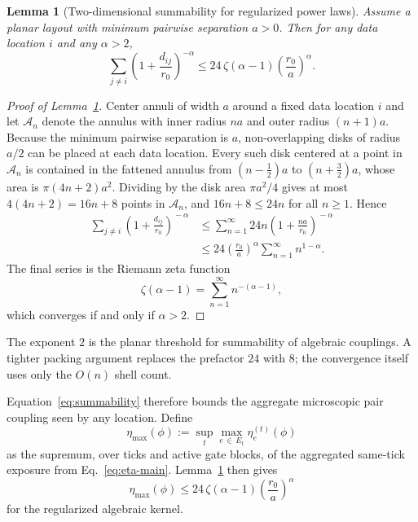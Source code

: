 \documentclass[
aps,
prx,
10pt,
twocolumn,
groupedaddress,
longbibliography,
nofootinbib,
floatfix
]{revtex4-2}
\newtheorem{lemma}{Lemma}
\theoremstyle{definition}
\begin{document}
\begin{lemma}[Two-dimensional summability for regularized power laws]
\label{lem:summability}
Assume a planar layout with minimum pairwise separation $a>0$. Then for any data location $i$ and any $\alpha>2$,
\begin{equation}
\sum_{j\neq i}\left(1+\frac{d_{ij}}{r_0}\right)^{-\alpha}
\le 24\,\zeta\left(\alpha-1\right)\left(\frac{r_0}{a}\right)^{\alpha}.
\label{eq:summability}
\end{equation}
\end{lemma}

\begin{proof}[Proof of Lemma~\ref{lem:summability}]
Center annuli of width $a$ around a fixed data location $i$ and let $\mathcal{A}_n$ denote the annulus with inner radius $na$ and outer radius $(n+1)a$. Because the minimum pairwise separation is $a$, non-overlapping disks of radius $a/2$ can be placed at each data location. Every such disk centered at a point in $\mathcal{A}_n$ is contained in the fattened annulus from $(n-\tfrac{1}{2})a$ to $(n+\tfrac{3}{2})a$, whose area is $\pi(4n+2)a^2$. Dividing by the disk area $\pi a^2/4$ gives at most $4(4n+2)=16n+8$ points in $\mathcal{A}_n$, and $16n+8\le 24n$ for all $n\ge 1$. Hence
\begin{align}
\sum_{j\neq i}\!\left(1+\frac{d_{ij}}{r_0}\right)^{\!-\alpha}
&\le \sum_{n=1}^{\infty}24n\!\left(1+\frac{na}{r_0}\right)^{\!-\alpha}\nonumber\\
&\le 24\!\left(\frac{r_0}{a}\right)^{\!\alpha}
\sum_{n=1}^{\infty} n^{1-\alpha}.
\end{align}
The final series is the Riemann zeta function
\begin{equation}
\zeta\left(\alpha-1\right)=\sum_{n=1}^{\infty}n^{-(\alpha-1)},
\end{equation}
which converges if and only if $\alpha>2$.
\end{proof}

The exponent $2$ is the planar threshold for summability of algebraic couplings. A tighter packing argument replaces the prefactor $24$ with $8$; the convergence itself uses only the $O(n)$ shell count.

Equation~\eqref{eq:summability} therefore bounds the aggregate microscopic pair coupling seen by any location. Define
\begin{equation}
\eta_{\max}(\phi):=\sup_t\max_{e\,\in\, E_t}\eta_e^{(t)}(\phi)
\end{equation}
as the supremum, over ticks and active gate blocks, of the aggregated same-tick exposure from Eq.~\eqref{eq:eta-main}. Lemma~\ref{lem:summability} then gives
\begin{equation}
\eta_{\max}(\phi)\le 24\,\zeta\!\left(\alpha-1\right)\!\left(\frac{r_0}{a}\right)^{\!\alpha}
\label{eq:eta-max}
\end{equation}
for the regularized algebraic kernel.
\end{document}
